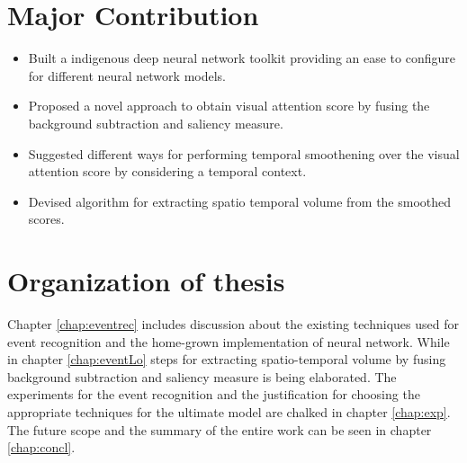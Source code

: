 \section{Major Contribution}
\begin{itemize}
	\item{Built a indigenous deep neural network toolkit providing an ease to configure for different neural network models.}
	\item{Proposed a novel approach to obtain visual attention score by fusing the background subtraction and saliency measure.}
	\item{Suggested different ways for performing temporal smoothening over the visual attention score by considering a temporal context.}
	\item{Devised algorithm for extracting spatio temporal volume from the smoothed scores.}
\end{itemize}

\section{Organization of thesis}
\par Chapter \ref{chap:eventrec} includes discussion about the existing techniques used for event recognition and the home-grown implementation of neural network.  While in chapter \ref{chap:eventLo} steps for extracting spatio-temporal volume by fusing background subtraction and saliency measure is being elaborated.  The experiments for the event recognition and the justification for choosing the appropriate techniques for the ultimate model are chalked in chapter \ref{chap:exp}.  The future scope and the summary of the entire work can be seen in chapter \ref{chap:concl}.
